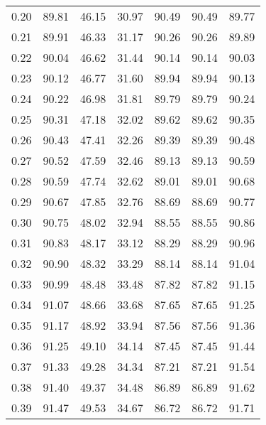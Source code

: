 \begin{tabular}{|c|c|c|c|c|c|c|}
      0.20 &     89.81 &     46.15 &      30.97 &   90.49 &      90.49 &         89.77 \\
      0.21 &     89.91 &     46.33 &      31.17 &   90.26 &      90.26 &         89.89 \\
      0.22 &     90.04 &     46.62 &      31.44 &   90.14 &      90.14 &         90.03 \\
      0.23 &     90.12 &     46.77 &      31.60 &   89.94 &      89.94 &         90.13 \\
      0.24 &     90.22 &     46.98 &      31.81 &   89.79 &      89.79 &         90.24 \\
      0.25 &     90.31 &     47.18 &      32.02 &   89.62 &      89.62 &         90.35 \\
      0.26 &     90.43 &     47.41 &      32.26 &   89.39 &      89.39 &         90.48 \\
      0.27 &     90.52 &     47.59 &      32.46 &   89.13 &      89.13 &         90.59 \\
      0.28 &     90.59 &     47.74 &      32.62 &   89.01 &      89.01 &         90.68 \\
      0.29 &     90.67 &     47.85 &      32.76 &   88.69 &      88.69 &         90.77 \\
      0.30 &     90.75 &     48.02 &      32.94 &   88.55 &      88.55 &         90.86 \\
      0.31 &     90.83 &     48.17 &      33.12 &   88.29 &      88.29 &         90.96 \\
      0.32 &     90.90 &     48.32 &      33.29 &   88.14 &      88.14 &         91.04 \\
      0.33 &     90.99 &     48.48 &      33.48 &   87.82 &      87.82 &         91.15 \\
      0.34 &     91.07 &     48.66 &      33.68 &   87.65 &      87.65 &         91.25 \\
      0.35 &     91.17 &     48.92 &      33.94 &   87.56 &      87.56 &         91.36 \\
      0.36 &     91.25 &     49.10 &      34.14 &   87.45 &      87.45 &         91.44 \\
      0.37 &     91.33 &     49.28 &      34.34 &   87.21 &      87.21 &         91.54 \\
      0.38 &     91.40 &     49.37 &      34.48 &   86.89 &      86.89 &         91.62 \\
      0.39 &     91.47 &     49.53 &      34.67 &   86.72 &      86.72 &         91.71 \\

\end{tabular}
